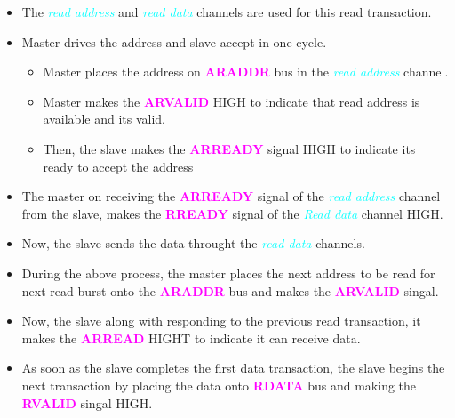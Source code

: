 \documentclass{article}
\newcommand{\chFormat}[1]{\emph{\textcolor{cyan}{#1}}}
\newcommand{\AXISignals}[1]{\textbf{\textcolor{magenta}{#1}}}
\begin{document}
\begin{itemize}
    \item The \chFormat{read address} and \chFormat{read data} channels are used for this read transaction.
    \item Master drives the address and slave accept in one cycle.
          \begin{itemize}
              \item Master places the address on \AXISignals{ARADDR} bus in the \chFormat{read address} channel.
              \item Master makes the \AXISignals{ARVALID} HIGH to indicate that read address is available and its valid.
              \item Then, the slave makes the \AXISignals{ARREADY} signal HIGH to indicate its ready to accept the address
          \end{itemize}
    \item The master on receiving the \AXISignals{ARREADY} signal of the \chFormat{read address} channel from the slave, makes the \AXISignals{RREADY} signal of the \chFormat{Read data} channel HIGH.
    \item Now, the slave sends the data throught the \chFormat{read data} channels.
    \item During the above process, the master places the next address to be read for next read burst onto the \AXISignals{ARADDR} bus and makes the \AXISignals{ARVALID} singal.
    \item Now, the slave along with responding to the previous read transaction, it makes the \AXISignals{ARREAD} HIGHT to indicate it can receive data.
    \item As soon as the slave completes the first data transaction, the slave begins the next transaction by placing the data onto \AXISignals{RDATA} bus and making the \AXISignals{RVALID} singal HIGH.
\end{itemize}
\end{document}
